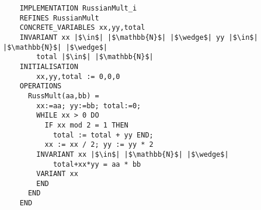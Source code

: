 \documentclass[varwidth=6cm, border={0.01cm 0.01cm 0.01cm 0.01cm}]{standalone}
\begin{document}

\begin{verbatim}
    IMPLEMENTATION RussianMult_i
    REFINES RussianMult
    CONCRETE_VARIABLES xx,yy,total
    INVARIANT xx |$\in$| |$\mathbb{N}$| |$\wedge$| yy |$\in$| |$\mathbb{N}$| |$\wedge$| 
        total |$\in$| |$\mathbb{N}$|
    INITIALISATION 
        xx,yy,total := 0,0,0
    OPERATIONS
      RussMult(aa,bb) = 
        xx:=aa; yy:=bb; total:=0;
        WHILE xx > 0 DO
          IF xx mod 2 = 1 THEN 
            total := total + yy END;
          xx := xx / 2; yy := yy * 2
        INVARIANT xx |$\in$| |$\mathbb{N}$| |$\wedge$|
            total+xx*yy = aa * bb
        VARIANT xx
        END
      END
    END
\end{verbatim}

\end{document}
